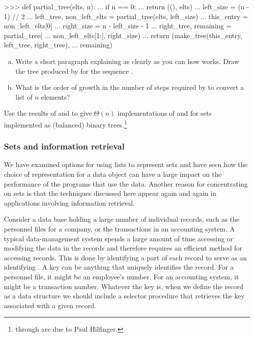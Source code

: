 \begin{exerciseGroup}
\begin{codeBlock}
>>> def partial_tree(elts, n):
...     if n == 0:
...         return ((), elts)
...     left_size = (n - 1) // 2
...     left_tree, non_left_elts = partial_tree(elts, left_size)
...     this_entry = non_left_elts[0]
...     right_size = n - left_size - 1
...     right_tree, remaining = partial_tree(
...         non_left_elts[1:], right_size)
...     return (make_tree(this_entry, left_tree, right_tree),
...             remaining)
\end{codeBlock}

\begin{enumerate}[a.]

\item
Write a short paragraph explaining as clearly as you can how
 works.  Draw the tree produced by 
for the sequence .

\item
What is the order of growth in the number of steps required by
 to convert a list of \( n \) elements?

\end{enumerate}

\label{Exercise 2.65}
 Use the results of 
and  to give \( \Theta(n) \) implementations of
 and  for sets implemented as
(balanced) binary trees.\footnote{ through  are due to Paul Hilfinger.}
\end{exerciseGroup}

\subsubsection*{Sets and information retrieval}

We have examined options for using lists to represent sets and have seen how
the choice of representation for a data object can have a large impact on the
performance of the programs that use the data.  Another reason for
concentrating on sets is that the techniques discussed here appear again and
again in applications involving information retrieval.

Consider a data base holding a large number of individual records, such as the
personnel files for a company, or the transactions in an accounting system. A
typical data-management system spends a large amount of time accessing or
modifying the data in the records and therefore requires an efficient method
for accessing records.  This is done by identifying a part of each record to
serve as an identifying .  A key can be anything that uniquely
identifies the record.  For a personnel file, it might be an employee's
 number.  For an accounting system, it might be a transaction
number.  Whatever the key is, when we define the record as a data structure we
should include a  selector procedure that retrieves the key
associated with a given record.

